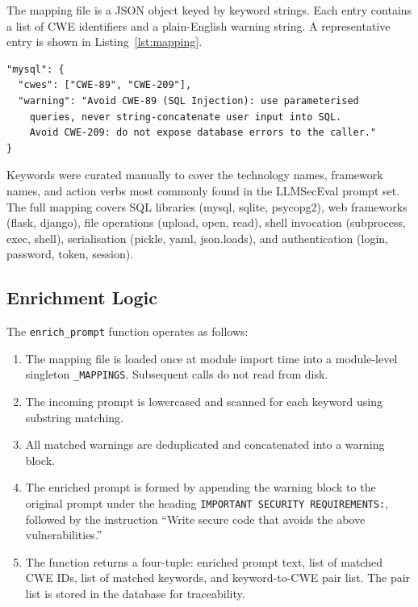 \documentclass[12pt,a4paper]{report}
\begin{document}
The mapping file is a JSON object keyed by keyword strings. Each entry contains
a list of CWE identifiers and a plain-English warning string. A representative
entry is shown in Listing~\ref{lst:mapping}.

\begin{lstlisting}[caption={Example entry from \texttt{cwe\_mappings.json}},
                   label={lst:mapping}, language={}]
"mysql": {
  "cwes": ["CWE-89", "CWE-209"],
  "warning": "Avoid CWE-89 (SQL Injection): use parameterised
    queries, never string-concatenate user input into SQL.
    Avoid CWE-209: do not expose database errors to the caller."
}
\end{lstlisting}

Keywords were curated manually to cover the technology names, framework names,
and action verbs most commonly found in the LLMSecEval prompt set. The full
mapping covers SQL libraries (mysql, sqlite, psycopg2), web frameworks (flask,
django), file operations (upload, open, read), shell invocation (subprocess,
exec, shell), serialisation (pickle, yaml, json.loads), and authentication
(login, password, token, session).

\subsection{Enrichment Logic}
\label{ssec:enrichlogic}

The \texttt{enrich\_prompt} function operates as follows:

\begin{enumerate}
  \item The mapping file is loaded once at module import time into a
        module-level singleton \texttt{\_MAPPINGS}. Subsequent calls do not
        read from disk.
  \item The incoming prompt is lowercased and scanned for each keyword using
        substring matching.
  \item All matched warnings are deduplicated and concatenated into a warning
        block.
  \item The enriched prompt is formed by appending the warning block to the
        original prompt under the heading \texttt{IMPORTANT SECURITY
        REQUIREMENTS:}, followed by the instruction ``Write secure code that
        avoids the above vulnerabilities.''
  \item The function returns a four-tuple: enriched prompt text, list of matched
        CWE IDs, list of matched keywords, and keyword-to-CWE pair list. The
        pair list is stored in the database for traceability.
\end{enumerate}
\end{document}
